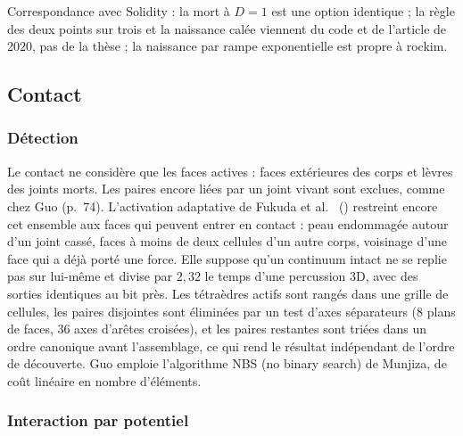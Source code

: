 Correspondance avec Solidity : la mort à $D = 1$ est une option identique ; la règle des deux points sur trois et la naissance calée viennent du code et de l'article de 2020, pas de la thèse ; la naissance par rampe exponentielle est propre à rockim.

\subsection{Contact}
\label{sec-contact}

\subsubsection{Détection}

Le contact ne considère que les faces actives : faces extérieures des corps et lèvres des joints morts. Les paires encore liées par un joint vivant sont exclues, comme chez Guo (p.~74). L'activation adaptative de Fukuda et al.~\cite{fukuda2020rmre} () restreint encore cet ensemble aux faces qui peuvent entrer en contact : peau endommagée autour d'un joint cassé, faces à moins de deux cellules d'un autre corps, voisinage d'une face qui a déjà porté une force. Elle suppose qu'un continuum intact ne se replie pas sur lui-même et divise par $2{,}32$ le temps d'une percussion 3D, avec des sorties identiques au bit près. Les tétraèdres actifs sont rangés dans une grille de cellules, les paires disjointes sont éliminées par un test d'axes séparateurs (8 plans de faces, 36 axes d'arêtes croisées), et les paires restantes sont triées dans un ordre canonique avant l'assemblage, ce qui rend le résultat indépendant de l'ordre de découverte. Guo emploie l'algorithme NBS (no binary search) de Munjiza, de coût linéaire en nombre d'éléments.

\subsubsection{Interaction par potentiel}

